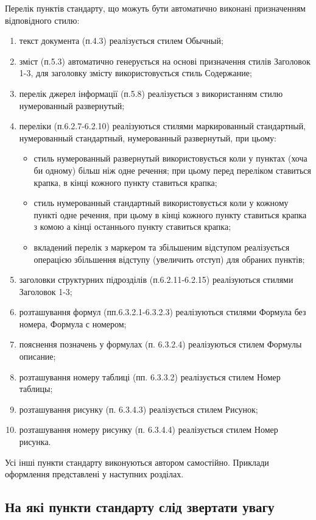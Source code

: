 Перелік пунктів стандарту, що можуть бути автоматично виконані призначенням відповідного стилю:
\begin{enumerate}
\item текст документа (п.4.3) реалізується стилем Обычный;
\item зміст (п.5.3) автоматично генерується на основі призначення стилів Заголовок 1-3, для заголовку змісту використовується стиль Содержание;
\item перелік джерел інформації (п.5.8) реалізується з використанням стилю нумерованный развернутый;
\item переліки (п.6.2.7-6.2.10) реалізуються стилями маркированный стандартный, нумерованный стандартный, нумерованный развернутый, при цьому:
\begin{itemize}
  \item стиль нумерованный развернутый використовується коли у пунктах (хоча би одному) більш ніж одне речення; при цьому перед переліком ставиться крапка, в кінці кожного пункту ставиться крапка;
  \item стиль нумерованный стандартный використовується коли у кожному пункті одне речення, при цьому в кінці кожного пункту ставиться крапка з   комою а кінці останнього пункту ставиться крапка;
  \item вкладений перелік з маркером та збільшеним відступом реалізується операцією збільшення відступу (увеличить отступ) для обраних пунктів;
\end{itemize}
\item заголовки структурних підрозділів (п.6.2.11-6.2.15) реалізуються стилями Заголовок 1-3;
\item розташування формул (пп.6.3.2.1-6.3.2.3) реалізуються стилями Формула без номера, Формула с номером;
\item пояснення позначень у формулах (п. 6.3.2.4) реалізуються стилем Формулы описание;
\item розташування номеру таблиці (пп. 6.3.3.2) реалізується стилем Номер таблицы;
\item розташування рисунку (п. 6.3.4.3) реалізується стилем Рисунок;
\item розташування номеру рисунку (п. 6.3.4.4) реалізується стилем Номер рисунка.
\end{enumerate}

Усі інші пункти стандарту виконуються автором самостійно. Приклади оформлення представлені у наступних розділах.

\subsection{На які пункти стандарту слід звертати увагу}


